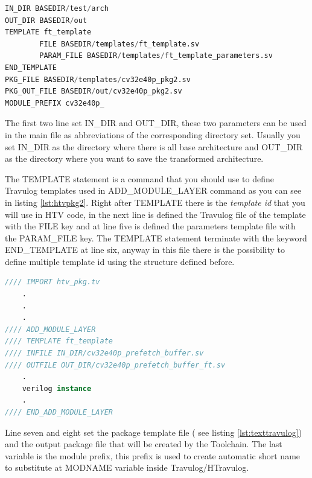 {{{{                \begin{lstlisting}[basicstyle=\ttfamily\scriptsize, language=Verilog, caption=Introduction of cv32e40p if stage, label=lst:htvpkg]
IN_DIR BASEDIR/test/arch
OUT_DIR BASEDIR/out
TEMPLATE ft_template
        FILE BASEDIR/templates/ft_template.sv
        PARAM_FILE BASEDIR/templates/ft_template_parameters.sv
END_TEMPLATE
PKG_FILE BASEDIR/templates/cv32e40p_pkg2.sv
PKG_OUT_FILE BASEDIR/out/cv32e40p_pkg2.sv
MODULE_PREFIX cv32e40p_
                \end{lstlisting}
                
                The first two line set IN\_DIR and OUT\_DIR, these two parameters can be used in the main file as abbreviations of the corresponding directory set. Usually you set IN\_DIR as the directory where there is all base architecture and OUT\_DIR as the directory where you want to save the transformed architecture.
                
                The TEMPLATE statement is a command that you should use to define Travulog templates used in ADD\_MODULE\_LAYER command as you can see in listing \ref{lst:htvpkg2}. Right after TEMPLATE there is the \textit{template id} that you will use in HTV code, in the next line is defined the Travulog file of the template with the FILE key and at line five is defined the parameters template file with the PARAM\_FILE key. The TEMPLATE statement terminate with the keyword END\_TEMPLATE at line six, anyway in this file there is the possibility to define multiple template id using the structure defined before.
                
                \begin{lstlisting}[basicstyle=\ttfamily\scriptsize, language=Verilog, caption=Introduction of cv32e40p if stage, label=lst:htvpkg2]
//// IMPORT htv_pkg.tv
    .
    .
    .
//// ADD_MODULE_LAYER 
//// TEMPLATE ft_template 
//// INFILE IN_DIR/cv32e40p_prefetch_buffer.sv
//// OUTFILE OUT_DIR/cv32e40p_prefetch_buffer_ft.sv
    .
    verilog instance
    .
//// END_ADD_MODULE_LAYER
                \end{lstlisting}
                
                
                Line seven and eight set the package template file ( see listing \ref{lst:texttravulog}) and the output package file that will be created by the Toolchain. The last variable is the module prefix, this prefix is used to create automatic short name to substitute at MODNAME variable inside Travulog/HTravulog.
                
}}}}
